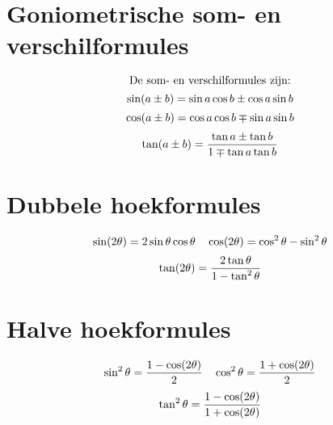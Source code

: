 \documentclass{article}
\begin{document}
\section*{Goniometrische som- en verschilformules}
\[ \text{De som- en verschilformules zijn:} \\
\]
\[ \sin(a \pm b) = \sin a \cos b \pm \cos a \sin b \\
\]
\[ \cos(a \pm b) = \cos a \cos b \mp \sin a \sin b \\
\]
\[ \tan(a \pm b) = \frac{\tan a \pm \tan b}{1 \mp \tan a \tan b} \\
\]

\section*{Dubbele hoekformules}
\[ \sin(2\theta) = 2 \sin \theta \cos \theta \quad \cos(2\theta) = \cos^2 \theta - \sin^2 \theta \\
\]
\[ \tan(2\theta) = \frac{2 \tan \theta}{1 - \tan^2 \theta} \\
\]

\section*{Halve hoekformules}
\[ \sin^2 \theta = \frac{1 - \cos(2\theta)}{2} \quad \cos^2 \theta = \frac{1 + \cos(2\theta)}{2} \\
\]
\[ \tan^2 \theta = \frac{1 - \cos(2\theta)}{1 + \cos(2\theta)} \\
\]
\end{document}
